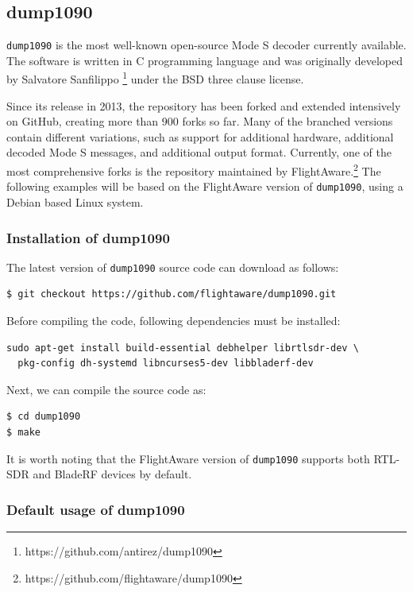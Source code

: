 \subsection{dump1090}

\texttt{dump1090} is the most well-known open-source Mode S decoder currently available. The software is written in C programming language and was originally developed by Salvatore Sanfilippo \footnote{https://github.com/antirez/dump1090} under the BSD three clause license.

Since its release in 2013, the repository has been forked and extended intensively on GitHub, creating more than 900 forks so far. Many of the branched versions contain different variations, such as support for additional hardware, additional decoded Mode S messages, and additional output format. Currently, one of the most comprehensive forks is the repository maintained by FlightAware.\footnote{https://github.com/flightaware/dump1090} The following examples will be based on the FlightAware version of \texttt{dump1090}, using a Debian based Linux system.

\subsubsection{Installation of dump1090}
The latest version of \texttt{dump1090} source code can download as follows:

\begin{verbatim}
$ git checkout https://github.com/flightaware/dump1090.git
\end{verbatim}

Before compiling the code, following dependencies must be installed:

\begin{verbatim}
sudo apt-get install build-essential debhelper librtlsdr-dev \
  pkg-config dh-systemd libncurses5-dev libbladerf-dev
\end{verbatim}

Next, we can compile the source code as:

\begin{verbatim}
$ cd dump1090
$ make
\end{verbatim}

It is worth noting that the FlightAware version of \texttt{dump1090} supports both RTL-SDR and BladeRF devices by default.

\subsubsection{Default usage of dump1090}

